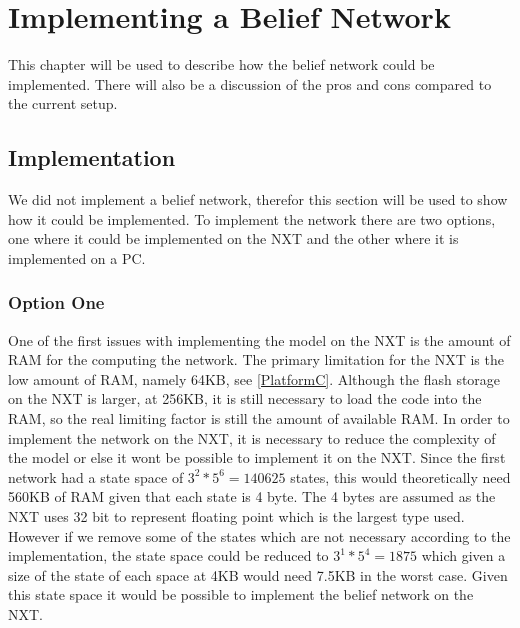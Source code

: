 \chapter{Implementing a Belief Network}
This chapter will be used to describe how the belief network could be
implemented. There will also be a discussion of the pros and cons compared to
the current setup.

\section{Implementation}

We did not implement a belief network, therefor this section will be used to
show how it could be implemented. To implement the network there are two
options, one where it could be implemented on the NXT and the other where it is
implemented on a PC. 

% 

\subsection{Option One}
One of the first issues with implementing the model on the NXT is the amount of
RAM for the computing the network. The primary limitation for the NXT is the
low amount of RAM, namely 64KB, see \autoref{PlatformC}. Although the flash
storage on the NXT is larger, at 256KB, it is still necessary to load the code
into the RAM, so the real limiting factor is still the amount of available RAM. 
In order to implement the network on the NXT, it is necessary to reduce the
complexity of the model or else it wont be possible to implement it on the NXT.
Since the first network had a state space of $3^2*5^6 = 140625$ states, this
would theoretically need 560KB of RAM given that each state is 4 byte. The 4
bytes are assumed as the NXT uses 32 bit to represent floating point which is
the largest type used. However if we remove some of the states which are not
necessary according to the implementation, the state space could be reduced to
$3^1*5^4 = 1875$ which given a size of the state of each space at 4KB would need
7.5KB in the worst case. Given this state space it would be possible to
implement the belief network on the NXT.

